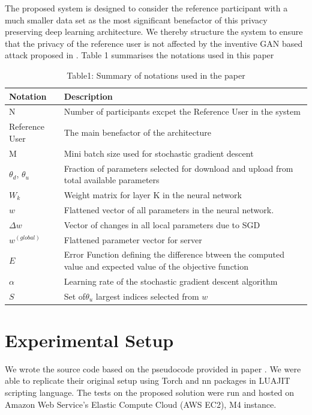 \documentclass[conference]{IEEEtran}
\begin{document}
The proposed system is designed to consider the reference participant with a much smaller data set as the most significant benefactor of this privacy preserving deep learning architecture. We thereby structure the system to ensure that the privacy of the reference user is not affected by the inventive GAN based attack proposed in \cite{GAN}.
Table 1 summarises the notations used in this paper


\begin{table}[!h]
\centering
\caption{Table1: Summary of notations used in the paper}
\label{table:1}
\begin{tabular}{ | m{} | m{}| } 
\hline
\textbf{Notation} & \textbf{Description} \\
 \hline\hline

N & Number of participants excpet the Reference User in the system\\
\hline
Reference User & The  main benefactor of the architecture \\
\hline
M & Mini batch size used for stochastic gradient descent\\
\hline
$\theta_d$, $\theta_u$ & Fraction of parameters selected for download and upload from total available parameters \\
\hline
$W_k$ & Weight matrix for layer K in the neural network\\
\hline
$w$ & Flattened vector of all parameters in the neural network. \\
\hline
$\Delta w$ & Vector of changes in all local parameters due to SGD\\
\hline
$w^{(global)}$ & Flattened parameter vector for server\\
\hline
$E$ & Error Function defining the difference btween the computed value and expected value of the objective function \\
\hline
$\alpha$ & Learning rate of the stochastic gradient descent algorithm\\
\hline
$S$ & Set of$\theta_u$ largest indices selected from $w$ \\
\hline
\end{tabular}
\end{table}
\section{Experimental Setup}
We wrote the source code based on the pseudocode provided in paper \cite{Shokri}. We were able to replicate their original setup using Torch and nn packages in LUAJIT scripting language. 
The tests on the proposed solution were run and hosted on Amazon Web Service's Elastic Compute Cloud (AWS EC2), M4 instance.
\end{document}
